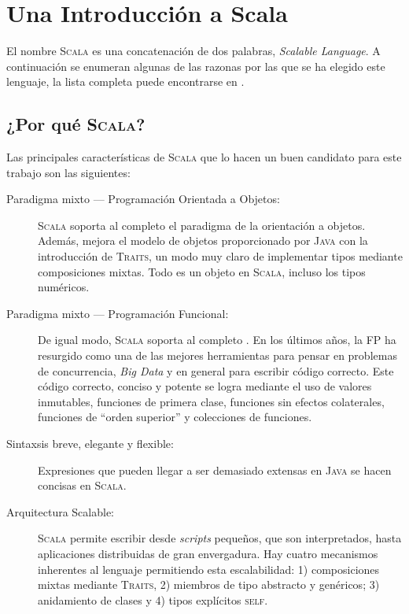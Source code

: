 \chapter{Una Introducción a Scala}
\label{ch:scalaintro}

El nombre \textsc{Scala} es una concatenación de dos palabras, \emph{Scalable
  Language}. A continuación se enumeran algunas de las razonas por las que se ha
elegido este lenguaje, la lista completa puede encontrarse en
\citeauthor{Dean2015} \cite{Dean2015}.

\section{¿Por qué \textsc{Scala}?}
\label{sec:whyscala}

Las principales características de \textsc{Scala} que lo hacen un buen candidato
para este trabajo son las siguientes:

\begin{description}
\item[Paradigma mixto --- Programación Orientada a Objetos:] \textsc{Scala}
  soporta al completo el paradigma de la orientación a objetos. Además, mejora
  el modelo de objetos proporcionado por \textsc{Java} con la introducción de
  \textsc{Traits}, un modo muy claro de implementar tipos mediante composiciones
  mixtas. Todo es un objeto en \textsc{Scala}, incluso los tipos numéricos.
\item [Paradigma mixto --- Programación Funcional:] De igual modo, \textsc{Scala}
  soporta al completo . En los últimos años, la \ac{FP} ha resurgido como una de las
  mejores herramientas para pensar en problemas de concurrencia, \emph{Big Data}
  y en general para escribir código correcto. Este
  código correcto, conciso y potente se logra mediante el uso de valores
  inmutables, funciones de primera clase, funciones sin efectos colaterales,
  funciones de ``orden superior'' y colecciones de funciones.
\item [Sintaxsis breve, elegante y flexible:] Expresiones que pueden llegar a
  ser demasiado extensas en \textsc{Java} se hacen concisas en \textsc{Scala}.
\item [Arquitectura Scalable:] \textsc{Scala} permite escribir desde
  \emph{scripts} pequeños, que son interpretados, hasta aplicaciones
  distribuidas de gran envergadura. Hay cuatro mecanismos inherentes al lenguaje
  permitiendo esta escalabilidad: 1) composiciones mixtas mediante
  \textsc{Traits}, 2) miembros de tipo abstracto y genéricos; 3) anidamiento de
  clases y 4) tipos explícitos \textsc{self}.
  
\end{description}

